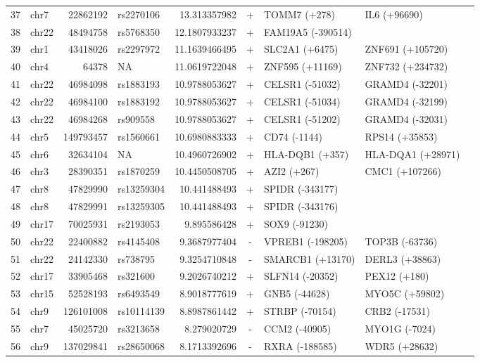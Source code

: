 \begin{table}[h!]
\begin{tabular}{rlrlrcllc}
37 & chr7 & 22862192 & rs2270106 & 13.313357982 & + & TOMM7 (+278) & IL6 (+96690)       & \\
38 & chr22 & 48494758 & rs5768350 & 12.1807933237 & + & FAM19A5 (-390514)        \\
39 & chr1 & 43418026 & rs2297972 & 11.1639466495 & + & SLC2A1 (+6475) & ZNF691 (+105720)       & \\
40 & chr4 & 64378 & NA & 11.0619722048 & + & ZNF595 (+11169) & ZNF732 (+234732)       & \\
41 & chr22 & 46984098 & rs1883193 & 10.9788053627 & + & CELSR1 (-51032) & GRAMD4 (-32201)       & \\
42 & chr22 & 46984100 & rs1883192 & 10.9788053627 & + & CELSR1 (-51034) & GRAMD4 (-32199)       & \\
43 & chr22 & 46984268 & rs909558 & 10.9788053627 & + & CELSR1 (-51202) & GRAMD4 (-32031)       & \\
44 & chr5 & 149793457 & rs1560661 & 10.6980883333 & + & CD74 (-1144) & RPS14 (+35853)       & \\
45 & chr6 & 32634104 & NA & 10.4960726902 & + & HLA-DQB1 (+357) & HLA-DQA1 (+28971)       & \\
46 & chr3 & 28390351 & rs1870259 & 10.4450508705 & + & AZI2 (+267) & CMC1 (+107266)       & \\
47 & chr8 & 47829990 & rs13259304 & 10.441488493 & + & SPIDR (-343177)        \\
48 & chr8 & 47829991 & rs13259305 & 10.441488493 & + & SPIDR (-343176)        \\
49 & chr17 & 70025931 & rs2193053 & 9.895586428 & + & SOX9 (-91230)        \\
50 & chr22 & 22400882 & rs4145408 & 9.3687977404 & - & VPREB1 (-198205) & TOP3B (-63736)       & \\
51 & chr22 & 24142330 & rs738795 & 9.3254710848 & - & SMARCB1 (+13170) & DERL3 (+38863)       & \\
52 & chr17 & 33905468 & rs321600 & 9.2026740212 & + & SLFN14 (-20352) & PEX12 (+180)       & \\
53 & chr15 & 52528193 & rs6493549 & 8.9018777619 & + & GNB5 (-44628) & MYO5C (+59802)       & \\
54 & chr9 & 126101008 & rs10114139 & 8.8987861442 & + & STRBP (-70154) & CRB2 (-17531)       & \\
55 & chr7 & 45025720 & rs3213658 & 8.279020729 & - & CCM2 (-40905) & MYO1G (-7024)       & \\
56 & chr9 & 137029841 & rs28650068 & 8.1713392696 & - & RXRA (-188585) & WDR5 (+28632)       & \\

\end{tabular}
\end{table}
